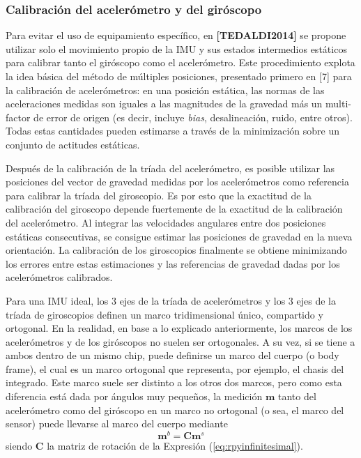 \subsubsection{Calibración del acelerómetro y del giróscopo}
Para evitar el uso de equipamiento específico, en \textbf{[TEDALDI2014]} se propone utilizar solo el movimiento propio de la IMU y sus estados intermedios estáticos para calibrar tanto el giróscopo como el acelerómetro. Este procedimiento explota la idea básica del método de múltiples posiciones, presentado primero en [7] para la calibración de acelerómetros: en una posición estática, las normas de las aceleraciones medidas son iguales a las magnitudes de la gravedad más un multi-factor de error de origen (es decir, incluye \textit{bias}, desalineación, ruido, entre otros). Todas estas cantidades pueden estimarse a través de la minimización sobre un conjunto de actitudes estáticas. 

Después de la calibración de la tríada del acelerómetro, es posible utilizar las posiciones del vector de gravedad medidas por los acelerómetros como referencia para calibrar la tríada del giroscopio. Es por esto que la exactitud de la calibración del giroscopo depende fuertemente de la exactitud de la calibración del acelerómetro. Al integrar las velocidades angulares entre dos posiciones estáticas consecutivas, se consigue estimar las posiciones de gravedad en la nueva orientación. La calibración de los giroscopios finalmente se obtiene minimizando los errores entre estas estimaciones y las referencias de gravedad dadas por los acelerómetros calibrados.

Para una IMU ideal, los 3 ejes de la tríada de acelerómetros y los 3 ejes de la tríada de giroscopios definen un marco tridimensional único, compartido y ortogonal. En la realidad, en base a lo explicado anteriormente, los marcos de los acelerómetros y de los giróscopos no suelen ser ortogonales. A su vez, si se tiene a ambos dentro de un mismo chip, puede definirse un marco del cuerpo (o body frame), el cual es un marco ortogonal que representa, por ejemplo, el chasis del integrado. Este marco suele ser distinto a los otros dos marcos, pero como esta diferencia está dada por ángulos muy pequeños, la medición $\bm{m}$ tanto del acelerómetro como del giróscopo en un marco no ortogonal (o sea, el marco del sensor) puede llevarse al marco del cuerpo mediante
\begin{equation}
    \bm{m}^b = \bm{C}\bm{m}^s
\end{equation}
siendo $\bm{C}$ la matriz de rotación de la Expresión (\ref{eq:rpyinfinitesimal}).

